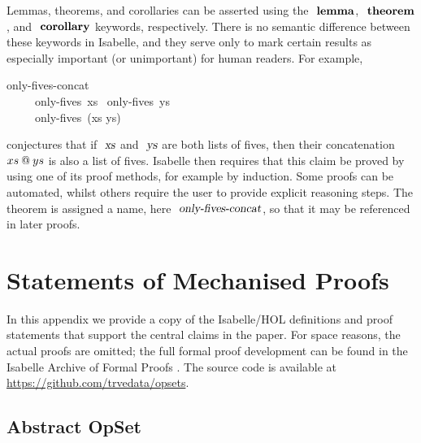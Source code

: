 Lemmas, theorems, and corollaries can be asserted using the $\isacommand{lemma}$, $\isacommand{theorem}$, and $\isacommand{corollary}$ keywords, respectively.
There is no semantic difference between these keywords in Isabelle, and they serve only to mark certain results as especially important (or unimportant) for human readers.
For example,
\begin{isabelle}
 only-fives-concat{\isacharcolon} \\
~~~~\ only-fives\ xs \ only-fives\ ys\\
~~~~\ only-fives\ (xs \isacharat ys)
\end{isabelle}
\noindent %
conjectures that if $\isa{xs}$ and $\isa{ys}$ are both lists of fives, then their concatenation $xs \mathbin{\emph{$@$}} ys$ is also a list of fives.
Isabelle then requires that this claim be proved by using one of its proof methods, for example by induction.
Some proofs can be automated, whilst others require the user to provide explicit reasoning steps.
The theorem is assigned a name, here $\isa{only-fives-concat}$, so that it may be referenced in later proofs.

\section{Statements of Mechanised Proofs}
\label{sect:appendix:statements}

In this appendix we provide a copy of the Isabelle/HOL definitions and proof statements that support the central claims in the paper.
For space reasons, the actual proofs are omitted; the full formal proof development can be found in the Isabelle Archive of Formal Proofs \cite{AFP}.
The source code is available at \url{https://github.com/trvedata/opsets}.

\subsection{Abstract OpSet}\label{sec:abstract-opset}

